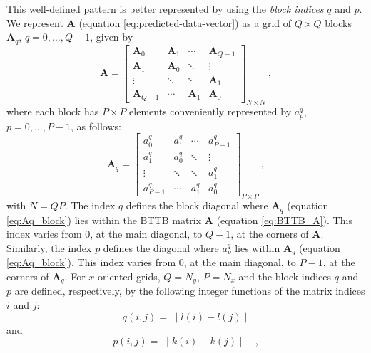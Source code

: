 This well-defined pattern is better represented by using the \textit{block indices} $q$ and $p$. 
We represent $\mathbf{A}$ (equation \ref{eq:predicted-data-vector}) as a grid of $Q \times Q$ blocks 
$\mathbf{A}_{q}$, $q = 0, \dots, Q - 1$, given by
\begin{equation}
	\mathbf{A} = \begin{bmatrix}
	\mathbf{A}_{0}   & \mathbf{A}_{1} & \cdots         & \mathbf{A}_{Q-1} \\
	\mathbf{A}_{1}   & \mathbf{A}_{0} & \ddots         & \vdots           \\ 
	\vdots           & \ddots         & \ddots         & \mathbf{A}_{1}   \\
	\mathbf{A}_{Q-1} & \cdots         & \mathbf{A}_{1} & \mathbf{A}_{0}                 
	\end{bmatrix}_{N \times N} \: ,
	\label{eq:BTTB_A}
\end{equation}
where each block has $P \times P$ elements conveniently represented by $a^{q}_{p}$, 
$p = 0, \dots, P - 1$, as follows:
\begin{equation}
	\mathbf{A}_{q} = \begin{bmatrix}
	a^{q}_{0}   & a^{q}_{1} & \cdots    & a^{q}_{P-1} \\
	a^{q}_{1}   & a^{q}_{0} & \ddots    & \vdots           \\ 
	\vdots      & \ddots    & \ddots    & a^{q}_{1}   \\
	a^{q}_{P-1} & \cdots    & a^{q}_{1} & a^{q}_{0}                 
	\end{bmatrix}_{P \times P} \: ,
	\label{eq:Aq_block}
\end{equation}
with $N = QP$. The index $q$ defines the block diagonal where $\mathbf{A}_{q}$ (equation \ref{eq:Aq_block}) 
lies within the BTTB matrix $\mathbf{A}$ (equation \ref{eq:BTTB_A}). 
This index varies from $0$, at the main diagonal, to $Q - 1$, at
the corners of $\mathbf{A}$. Similarly, the index $p$ defines the diagonal where $a^{q}_{p}$ 
lies within $\mathbf{A}_{q}$ (equation \ref{eq:Aq_block}). This index varies from $0$, 
at the main diagonal, to $P - 1$, at the corners of $\mathbf{A}_{q}$.
For $x$-oriented grids, $Q = N_{y}$, $P = N_{x}$ and the block indices
$q$ and $p$ are defined, respectively, by the following integer functions 
of the matrix indices $i$ and $j$:
\begin{equation}
q(i, j) = \; \mid l(i) - l(j) \mid
\label{eq:q-x-oriented}
\end{equation}
and
\begin{equation}
p(i, j) = \; \mid k(i) - k(j) \mid \quad ,
\label{eq:p-x-oriented}
\end{equation}
